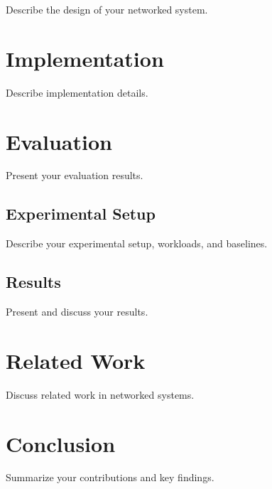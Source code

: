 \documentclass[letterpaper,twocolumn,10pt]{article}
\begin{document}
Describe the design of your networked system.

\section{Implementation}
\label{sec:implementation}

Describe implementation details.

\section{Evaluation}
\label{sec:evaluation}

Present your evaluation results.

\subsection{Experimental Setup}

Describe your experimental setup, workloads, and baselines.

\subsection{Results}

Present and discuss your results.

\section{Related Work}
\label{sec:related}

Discuss related work in networked systems.

\section{Conclusion}
\label{sec:conclusion}

Summarize your contributions and key findings.

{\footnotesize 
}
\end{document}
